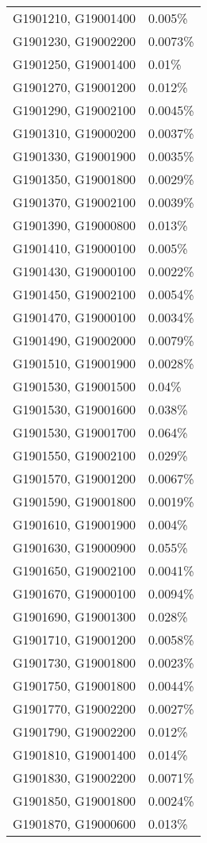 \begin{longtable}[]{@{}ll@{}}
G1901210, G19001400 & 0.005\% \\
G1901230, G19002200 & 0.0073\% \\
G1901250, G19001400 & 0.01\% \\
G1901270, G19001200 & 0.012\% \\
G1901290, G19002100 & 0.0045\% \\
G1901310, G19000200 & 0.0037\% \\
G1901330, G19001900 & 0.0035\% \\
G1901350, G19001800 & 0.0029\% \\
G1901370, G19002100 & 0.0039\% \\
G1901390, G19000800 & 0.013\% \\
G1901410, G19000100 & 0.005\% \\
G1901430, G19000100 & 0.0022\% \\
G1901450, G19002100 & 0.0054\% \\
G1901470, G19000100 & 0.0034\% \\
G1901490, G19002000 & 0.0079\% \\
G1901510, G19001900 & 0.0028\% \\
G1901530, G19001500 & 0.04\% \\
G1901530, G19001600 & 0.038\% \\
G1901530, G19001700 & 0.064\% \\
G1901550, G19002100 & 0.029\% \\
G1901570, G19001200 & 0.0067\% \\
G1901590, G19001800 & 0.0019\% \\
G1901610, G19001900 & 0.004\% \\
G1901630, G19000900 & 0.055\% \\
G1901650, G19002100 & 0.0041\% \\
G1901670, G19000100 & 0.0094\% \\
G1901690, G19001300 & 0.028\% \\
G1901710, G19001200 & 0.0058\% \\
G1901730, G19001800 & 0.0023\% \\
G1901750, G19001800 & 0.0044\% \\
G1901770, G19002200 & 0.0027\% \\
G1901790, G19002200 & 0.012\% \\
G1901810, G19001400 & 0.014\% \\
G1901830, G19002200 & 0.0071\% \\
G1901850, G19001800 & 0.0024\% \\
G1901870, G19000600 & 0.013\% \\

\end{longtable}

